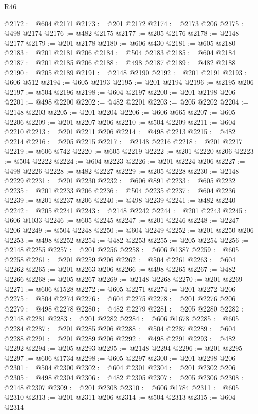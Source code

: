 \begin{lexlean}{R46}
\begin{coremodule}
@2172 := @604 @2171
@2173 := @201 @2172
@2174 := @2173 @206
@2175 := @498 @2174
@2176 := @482 @2175
@2177 := @205 @2176
@2178 := @2148 @2177
@2179 := @201 @2178
@2180 := @606 @430
@2181 := @605 @2180
@2183 := @201 @2181 @206
@2184 := @504 @2183
@2185 := @604 @2184
@2187 := @201 @2185 @206
@2188 := @498 @2187
@2189 := @482 @2188
@2190 := @205 @2189
@2191 := @2148 @2190
@2192 := @201 @2191
@2193 := @606 @512
@2194 := @605 @2193
@2195 := @201 @2194
@2196 := @2195 @206
@2197 := @504 @2196
@2198 := @604 @2197
@2200 := @201 @2198 @206
@2201 := @498 @2200
@2202 := @482 @2201
@2203 := @205 @2202
@2204 := @2148 @2203
@2205 := @201 @2204
@2206 := @606 @665
@2207 := @605 @2206
@2209 := @201 @2207 @206
@2210 := @504 @2209
@2211 := @604 @2210
@2213 := @201 @2211 @206
@2214 := @498 @2213
@2215 := @482 @2214
@2216 := @205 @2215
@2217 := @2148 @2216
@2218 := @201 @2217
@2219 := @606 @742
@2220 := @605 @2219
@2222 := @201 @2220 @206
@2223 := @504 @2222
@2224 := @604 @2223
@2226 := @201 @2224 @206
@2227 := @498 @2226
@2228 := @482 @2227
@2229 := @205 @2228
@2230 := @2148 @2229
@2231 := @201 @2230
@2232 := @606 @891
@2233 := @605 @2232
@2235 := @201 @2233 @206
@2236 := @504 @2235
@2237 := @604 @2236
@2239 := @201 @2237 @206
@2240 := @498 @2239
@2241 := @482 @2240
@2242 := @205 @2241
@2243 := @2148 @2242
@2244 := @201 @2243
@2245 := @606 @1033
@2246 := @605 @2245
@2247 := @201 @2246
@2248 := @2247 @206
@2249 := @504 @2248
@2250 := @604 @2249
@2252 := @201 @2250 @206
@2253 := @498 @2252
@2254 := @482 @2253
@2255 := @205 @2254
@2256 := @2148 @2255
@2257 := @201 @2256
@2258 := @606 @1387
@2259 := @605 @2258
@2261 := @201 @2259 @206
@2262 := @504 @2261
@2263 := @604 @2262
@2265 := @201 @2263 @206
@2266 := @498 @2265
@2267 := @482 @2266
@2268 := @205 @2267
@2269 := @2148 @2268
@2270 := @201 @2269
@2271 := @606 @1528
@2272 := @605 @2271
@2274 := @201 @2272 @206
@2275 := @504 @2274
@2276 := @604 @2275
@2278 := @201 @2276 @206
@2279 := @498 @2278
@2280 := @482 @2279
@2281 := @205 @2280
@2282 := @2148 @2281
@2283 := @201 @2282
@2284 := @606 @1678
@2285 := @605 @2284
@2287 := @201 @2285 @206
@2288 := @504 @2287
@2289 := @604 @2288
@2291 := @201 @2289 @206
@2292 := @498 @2291
@2293 := @482 @2292
@2294 := @205 @2293
@2295 := @2148 @2294
@2296 := @201 @2295
@2297 := @606 @1734
@2298 := @605 @2297
@2300 := @201 @2298 @206
@2301 := @504 @2300
@2302 := @604 @2301
@2304 := @201 @2302 @206
@2305 := @498 @2304
@2306 := @482 @2305
@2307 := @205 @2306
@2308 := @2148 @2307
@2309 := @201 @2308
@2310 := @606 @1784
@2311 := @605 @2310
@2313 := @201 @2311 @206
@2314 := @504 @2313
@2315 := @604 @2314

\end{coremodule}
\end{lexlean}
